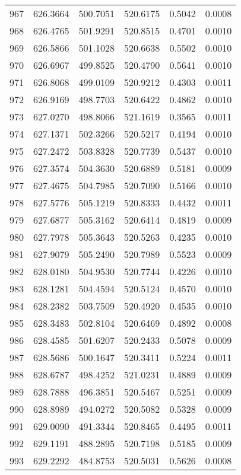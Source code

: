 \documentclass{article}
\begin{document}
\begin{longtable}{|c|c|c|c|c|c|}
967 & 626.3664 & 500.7051 & 520.6175 & 0.5042 & 0.0008 \\
968 & 626.4765 & 501.9291 & 520.8515 & 0.4701 & 0.0010 \\
969 & 626.5866 & 501.1028 & 520.6638 & 0.5502 & 0.0010 \\
970 & 626.6967 & 499.8525 & 520.4790 & 0.5641 & 0.0010 \\
971 & 626.8068 & 499.0109 & 520.9212 & 0.4303 & 0.0011 \\
972 & 626.9169 & 498.7703 & 520.6422 & 0.4862 & 0.0010 \\
973 & 627.0270 & 498.8066 & 521.1619 & 0.3565 & 0.0011 \\
974 & 627.1371 & 502.3266 & 520.5217 & 0.4194 & 0.0010 \\
975 & 627.2472 & 503.8328 & 520.7739 & 0.5437 & 0.0010 \\
976 & 627.3574 & 504.3630 & 520.6889 & 0.5181 & 0.0009 \\
977 & 627.4675 & 504.7985 & 520.7090 & 0.5166 & 0.0010 \\
978 & 627.5776 & 505.1219 & 520.8333 & 0.4432 & 0.0011 \\
979 & 627.6877 & 505.3162 & 520.6414 & 0.4819 & 0.0009 \\
980 & 627.7978 & 505.3643 & 520.5263 & 0.4235 & 0.0010 \\
981 & 627.9079 & 505.2490 & 520.7989 & 0.5523 & 0.0009 \\
982 & 628.0180 & 504.9530 & 520.7744 & 0.4226 & 0.0010 \\
983 & 628.1281 & 504.4594 & 520.5124 & 0.4570 & 0.0010 \\
984 & 628.2382 & 503.7509 & 520.4920 & 0.4535 & 0.0010 \\
985 & 628.3483 & 502.8104 & 520.6469 & 0.4892 & 0.0008 \\
986 & 628.4585 & 501.6207 & 520.2433 & 0.5078 & 0.0009 \\
987 & 628.5686 & 500.1647 & 520.3411 & 0.5224 & 0.0011 \\
988 & 628.6787 & 498.4252 & 521.0231 & 0.4889 & 0.0009 \\
989 & 628.7888 & 496.3851 & 520.5467 & 0.5251 & 0.0009 \\
990 & 628.8989 & 494.0272 & 520.5082 & 0.5328 & 0.0009 \\
991 & 629.0090 & 491.3344 & 520.8465 & 0.4495 & 0.0011 \\
992 & 629.1191 & 488.2895 & 520.7198 & 0.5185 & 0.0009 \\
993 & 629.2292 & 484.8753 & 520.5031 & 0.5626 & 0.0008 \\

\end{longtable}
\end{document}
